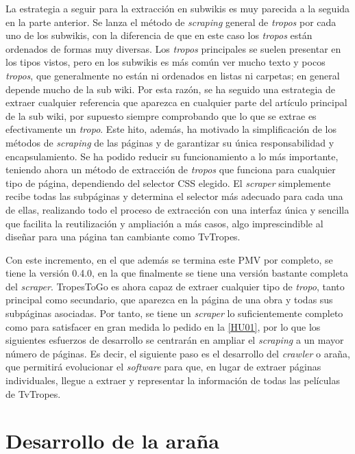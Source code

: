 La estrategia a seguir para la extracción en subwikis es muy parecida a la
seguida en la parte anterior. Se lanza el método de \textit{scraping} general de
\textit{tropos} por cada uno de los subwikis, con la diferencia de que en este
caso los \textit{tropos} están ordenados de formas muy diversas. Los
\textit{tropos} principales se suelen presentar en los tipos vistos, pero en los
subwikis es más común ver mucho texto y pocos \textit{tropos}, que generalmente
no están ni ordenados en listas ni carpetas; en general depende mucho de la sub
wiki. Por esta razón, se ha seguido una estrategia de extraer cualquier
referencia que aparezca en cualquier parte del artículo principal de la sub
wiki, por supuesto siempre comprobando que lo que se extrae es efectivamente un
\textit{tropo}. Este hito, además, ha motivado la simplificación de los métodos
de \textit{scraping} de las páginas y de garantizar su única responsabilidad y
encapsulamiento. Se ha podido reducir su funcionamiento a lo más importante,
teniendo ahora un método de extracción de \textit{tropos} que funciona para
cualquier tipo de página, dependiendo del selector CSS elegido. El
\textit{scraper} simplemente recibe todas las subpáginas y determina el
selector más adecuado para cada una de ellas, realizando todo el proceso de
extracción con una interfaz única y sencilla que facilita la reutilización y
ampliación a más casos, algo imprescindible al diseñar para una página tan
cambiante como TvTropes.

Con este incremento, en el que además se termina este PMV por completo, se tiene
la versión 0.4.0, en la que finalmente se tiene una versión bastante completa
del \textit{scraper}. TropesToGo es ahora capaz de extraer cualquier tipo de
\textit{tropo}, tanto principal como secundario, que aparezca en la página de
una obra y todas sus subpáginas asociadas. Por tanto, se tiene un
\textit{scraper} lo suficientemente completo como para satisfacer en gran medida
lo pedido en la
\href{https://github.com/jlgallego99/TropesToGo/issues/6}{[HU01]}, por lo que
los siguientes esfuerzos de desarrollo se centrarán en ampliar el
\textit{scraping} a un mayor número de páginas. Es decir, el siguiente paso es
el desarrollo del \textit{crawler} o araña, que permitirá evolucionar el
\textit{software} para que, en lugar de extraer páginas individuales, llegue a
extraer y representar la información de todas las películas de TvTropes.

\section{Desarrollo de la araña}

